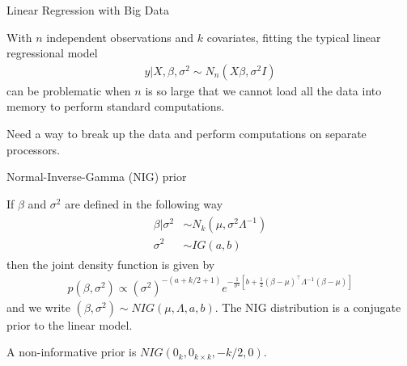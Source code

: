\documentclass[mathserif, 11pt, t]{beamer}
\begin{document}





% 
% 

\begin{frame}{Linear Regression with Big Data}

With $n$ independent observations and $k$ covariates, fitting the typical linear regressional model
\begin{align}
y|X,\beta,\sigma^2 \sim N_n\left(X\beta,\sigma^2 I\right)
\end{align}
can be problematic when $n$ is so large that we cannot load all the data into memory to perform standard computations.
\bigskip

Need a way to break up the data and perform computations on separate processors.

\end{frame}


\begin{frame}{Normal-Inverse-Gamma (NIG) prior}

If $\beta$ and $\sigma^2$ are defined in the following way
\begin{align}
\begin{split}
\beta | \sigma^2 & \sim N_k(\mu, \sigma^2 \Lambda^{-1}) \\
\sigma^2 & \sim IG(a, b)
\end{split}
\end{align}
then the joint density function is given by
\begin{align}
p(\beta, \sigma^2) \propto (\sigma^2)^{-(a+k/2+1)}e^{-\frac{1}{\sigma^2}\left[b+\frac{1}{2}(\beta-\mu)^\top \Lambda^{-1}(\beta-\mu)\right]}
\end{align}
and we write $(\beta,\sigma^2)\sim NIG(\mu, \Lambda, a, b)$. The NIG distribution is a conjugate prior to the linear model.
\bigskip

A non-informative prior is $NIG(0_k, 0_{k\times k}, -k/2, 0)$.

\end{frame}
\end{document}
